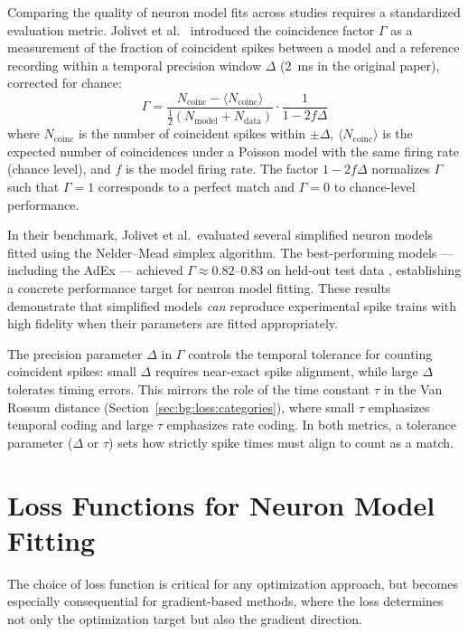 Comparing the quality of neuron model fits across studies requires a standardized evaluation metric.
Jolivet et al.\ \cite{Jolivet2008} introduced the coincidence factor $\Gamma$ as
a measurement of the fraction of coincident spikes between a model and a reference recording within a temporal precision window $\Delta$ ($2$~ms in the original paper), corrected for chance:
\begin{equation}\label{eq:gamma}
  \Gamma = \frac{N_{\text{coinc}} - \langle N_{\text{coinc}} \rangle}{\tfrac{1}{2}(N_{\text{model}} + N_{\text{data}})} \cdot \frac{1}{1 - 2 f \Delta}
\end{equation}
where $N_{\text{coinc}}$ is the number of coincident spikes within $\pm\Delta$, $\langle N_{\text{coinc}} \rangle$ is the expected number of coincidences under a Poisson model with the same firing rate (chance level), and $f$ is the model firing rate.
The factor $1 - 2 f \Delta$ normalizes $\Gamma$ such that $\Gamma = 1$ corresponds to a perfect match and $\Gamma = 0$ to chance-level performance.

In their benchmark, Jolivet et al.\ evaluated several simplified neuron models fitted using the Nelder--Mead simplex algorithm.
The best-performing models --- including the \gls{AdEx} --- achieved $\Gamma \approx 0.82$--$0.83$ on held-out test data \cite{Jolivet2008}, establishing a concrete performance target for neuron model fitting.
These results demonstrate that simplified models \emph{can} reproduce experimental spike trains with high fidelity when their parameters are fitted appropriately.

The precision parameter $\Delta$ in $\Gamma$ controls the temporal tolerance for counting coincident spikes: small $\Delta$ requires near-exact spike alignment, while large $\Delta$ tolerates timing errors.
This mirrors the role of the time constant $\tau$ in the Van Rossum distance (Section~\ref{sec:bg:loss:categories}), where small $\tau$ emphasizes temporal coding and large $\tau$ emphasizes rate coding.
In both metrics, a tolerance parameter ($\Delta$ or $\tau$) sets how strictly spike times must align to count as a match.

\section{Loss Functions for Neuron Model Fitting}\label{sec:rw:loss}

The choice of loss function is critical for any optimization approach, but becomes especially consequential for gradient-based methods, where the loss determines not only the optimization target but also the gradient direction.

